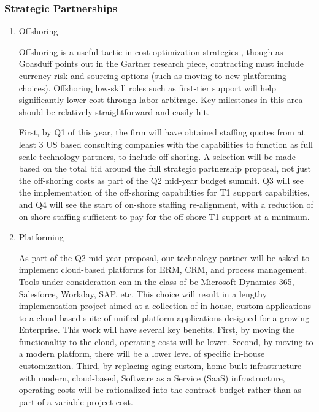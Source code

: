 \documentclass[stu]{apa7}
\begin{document}
\subsubsection{Strategic Partnerships}
\label{sec:org4d76e2f}

\begin{enumerate}
\item Offshoring
\label{sec:org4b69967}

Offshoring is a useful tactic in cost optimization strategies \citep{goasduffSecretsCostOptimization2016}, though as Goasduff points out in the Gartner research piece, contracting must include currency risk and sourcing options (such as moving to new platforming choices). Offshoring low-skill roles such as first-tier support will help significantly lower cost through labor arbitrage. Key milestones in this area should be relatively straightforward and easily hit.

First, by Q1 of this year, the firm will have obtained staffing quotes from at least 3 US based consulting companies with the capabilities to function as full scale technology partners, to include off-shoring. A selection will be made based on the total bid around the full strategic partnership proposal, not just the off-shoring costs as part of the Q2 mid-year budget summit. Q3 will see the implementation of the off-shoring capabilities for T1 support capabilities, and Q4 will see the start of on-shore staffing re-alignment, with a reduction of on-shore staffing sufficient to pay for the off-shore T1 support at a minimum.

\item Platforming
\label{sec:orgde136af}

As part of the Q2 mid-year proposal, our technology partner will be asked to implement cloud-based platforms for ERM, CRM, and process management. Tools under consideration can in the class of be Microsoft Dynamics 365, Salesforce, Workday, SAP, etc. This choice will result in a lengthy implementation project aimed at a collection of in-house, custom applications to a cloud-based suite of unified platform applications designed for a growing Enterprise. This work will have several key benefits. First, by moving the functionality to the cloud, operating costs will be lower. Second, by moving to a modern platform, there will be a lower level of specific in-house customization. Third, by replacing aging custom, home-built infrastructure with modern, cloud-based, Software as a Service (SaaS) infrastructure, operating costs will be rationalized into the contract budget rather than as part of a variable project cost.


\end{enumerate}
\end{document}
